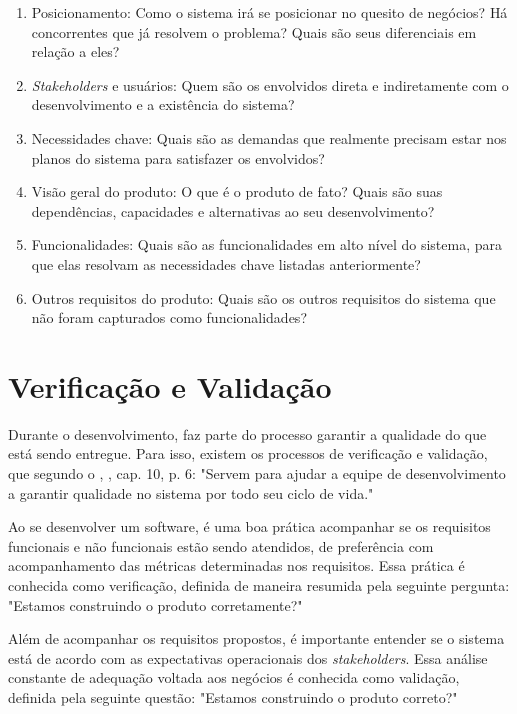 \begin{enumerate}
    \item Posicionamento: Como o sistema irá se posicionar no quesito de negócios? Há concorrentes que já resolvem o problema? Quais são seus diferenciais em relação a eles?
    \item \textit{Stakeholders} e usuários: Quem são os envolvidos direta e indiretamente com o desenvolvimento e a existência do sistema?
    \item Necessidades chave: Quais são as demandas que realmente precisam estar nos planos do sistema para satisfazer os envolvidos?
    \item Visão geral do produto: O que é o produto de fato? Quais são suas dependências, capacidades e alternativas ao seu desenvolvimento?
    \item Funcionalidades: Quais são as funcionalidades em alto nível do sistema, para que elas resolvam as necessidades chave listadas anteriormente?
    \item Outros requisitos do produto: Quais são os outros requisitos do sistema que não foram capturados como funcionalidades?
\end{enumerate}

\section{Verificação e Validação}
Durante o desenvolvimento, faz parte do processo garantir a qualidade do que está sendo entregue. Para isso, existem os processos de verificação e validação, que segundo o \citeauthor{ieeecomputersociety2014}, \citeyear{ieeecomputersociety2014}, cap. 10, p. 6: "Servem para ajudar a equipe de desenvolvimento a garantir qualidade no sistema por todo seu ciclo de vida."

Ao se desenvolver um software, é uma boa prática acompanhar se os requisitos funcionais e não funcionais estão sendo atendidos, de preferência com acompanhamento das métricas determinadas nos requisitos. Essa prática é conhecida como verificação, definida de maneira resumida pela seguinte pergunta\cite[cap. ~10, p. ~6]{ieeecomputersociety2014}: "Estamos construindo o produto corretamente?"

Além de acompanhar os requisitos propostos, é importante entender se o sistema está de acordo com as expectativas operacionais dos \textit{stakeholders}. Essa análise constante de adequação voltada aos negócios é conhecida como validação, definida pela seguinte questão\cite[cap. ~10, p. ~6]{ieeecomputersociety2014}: "Estamos construindo o produto correto?"

